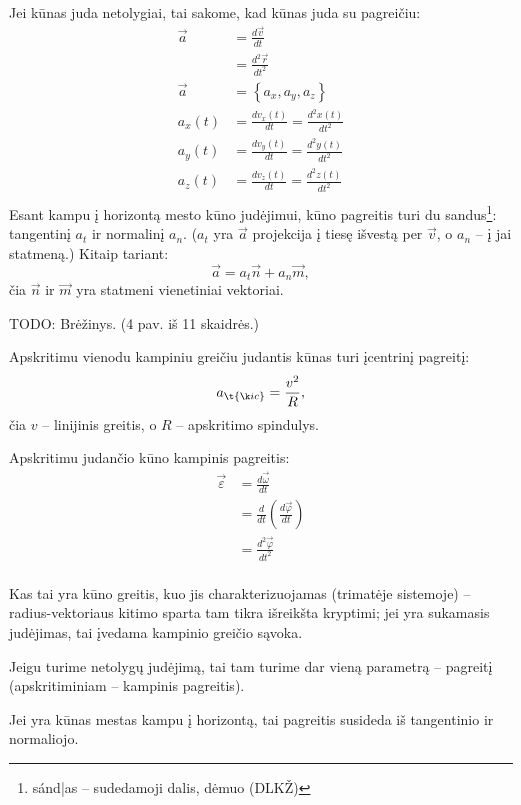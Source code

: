 Jei kūnas juda netolygiai, tai sakome, kad kūnas juda su pagreičiu:
\begin{align*}
  \vec{a}
  &= \frac{d\vec{v}}{dt} \\
  &= \frac{d^{2}\vec{r}}{dt^{2}} \\
  \vec{a} &= \left\{ a_{x}, a_{y}, a_{z} \right\} \\
  a_{x}(t) &= \frac{dv_{x}(t)}{dt} = \frac{d^{2}x(t)}{dt^{2}} \\
  a_{y}(t) &= \frac{dv_{y}(t)}{dt} = \frac{d^{2}y(t)}{dt^{2}} \\
  a_{z}(t) &= \frac{dv_{z}(t)}{dt} = \frac{d^{2}z(t)}{dt^{2}} \\
\end{align*}
Esant kampu į horizontą mesto kūno judėjimui, kūno pagreitis
turi du sandus\footnote{sánd|as – sudedamoji dalis, dėmuo (DLKŽ)}:
tangentinį $a_{t}$ ir normalinį $a_{n}$. ($a_{t}$ yra $\vec{a}$ projekcija
į tiesę išvestą per $\vec{v}$, o $a_{n}$ – į jai statmeną.) Kitaip
tariant:
\begin{equation*}
  \vec{a} = a_{t} \vec{n} + a_{n} \vec{m},
\end{equation*}
čia $\vec{n}$ ir $\vec{m}$ yra statmeni vienetiniai vektoriai.

TODO: Brėžinys. (4 pav. iš 11 skaidrės.)

Apskritimu vienodu kampiniu greičiu judantis kūnas turi įcentrinį
pagreitį:
\begin{equation*}
  a_{\t{įc}} = \frac{v^{2}}{R},
\end{equation*}
čia $v$ – linijinis greitis, o $R$ – apskritimo spindulys.

Apskritimu judančio kūno kampinis pagreitis:
\begin{align*}
  \vec{\varepsilon}
  &= \frac{d\vec{\omega}}{dt} \\
  &= \frac{d}{dt} \left( \frac{d\vec{\varphi}}{dt} \right) \\
  &= \frac{d^{2}\vec{\varphi}}{dt^{2}} \\
\end{align*}

\begin{remember}
  \item Kas tai yra kūno greitis, kuo jis charakterizuojamas (trimatėje
    sistemoje) – radius-vektoriaus kitimo sparta tam tikra išreikšta
    kryptimi; jei yra sukamasis judėjimas, tai įvedama kampinio greičio
    sąvoka.
  \item Jeigu turime netolygų judėjimą, tai tam turime dar vieną parametrą
    – pagreitį (apskritiminiam – kampinis pagreitis).
  \item Jei yra kūnas mestas kampu į horizontą, tai pagreitis susideda
    iš tangentinio ir normaliojo.
\end{remember}

